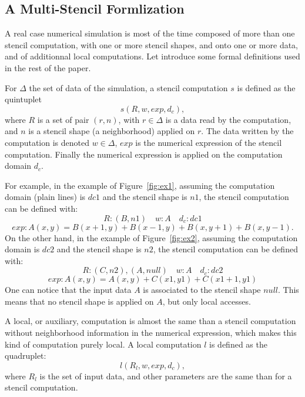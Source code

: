 \subsection{A Multi-Stencil Formlization}
\label{sect:multistencil}
A real case numerical simulation is most of the time composed of more than one stencil computation, with one or more stencil shapes, and onto one or more data, and of additionnal local computations.
Let introduce some formal definitions used in the rest of the paper.

For $\Delta$ the set of data of the simulation, a stencil computation $s$ is defined as the quintuplet
\begin{equation} 
s(R,w,exp,d_c),
\label{eq:st}
\end{equation}
where $R$ is a set of pair $(r,n)$, with $r \in \Delta$ is a data read by the computation, and $n$ is a stencil shape (a neighborhood) applied on $r$. The data written by the computation is denoted $w \in \Delta$, $exp$ is the numerical expression of the stencil computation. Finally the numerical expression is applied on the computation domain $d_c$.

For example, in the example of Figure~\ref{fig:ex1}, assuming the computation domain (plain lines) is $dc1$ and the stencil shape is $n1$, the stencil computation can be defined with:
\begin{equation*}
R: {(B,n1)} \quad w: A \quad d_c: dc1
\end{equation*}
\begin{equation*}
exp: A(x,y)=B(x+1,y)+B(x-1,y)+B(x,y+1)+B(x,y-1).
\end{equation*}
On the other hand, in the example of Figure~\ref{fig:ex2}, assuming the computation domain is $dc2$ and the stencil shape is $n2$, the stencil computation can be defined with:
\begin{equation*}
R: {(C,n2),(A,null)} \quad w: A \quad d_c: dc2
\end{equation*}
\begin{equation*}
exp: A(x,y)=A(x,y)+C(x1,y1)+C(x1+1,y1)
\end{equation*}
One can notice that the input data $A$ is associated to the stencil shape $null$. This means that no stencil shape is applied on $A$, but only local accesses.

A local, or auxiliary, computation is almost the same than a stencil computation without neighborhood information in the numerical expression, which makes this kind of computation purely local. A local computation $l$ is defined as the quadruplet:
\begin{equation} 
l(R_l,w,exp,d_c),
\label{eq:loc}
\end{equation}
where $R_l$ is the set of input data, and other parameters are the same than for a stencil computation.

